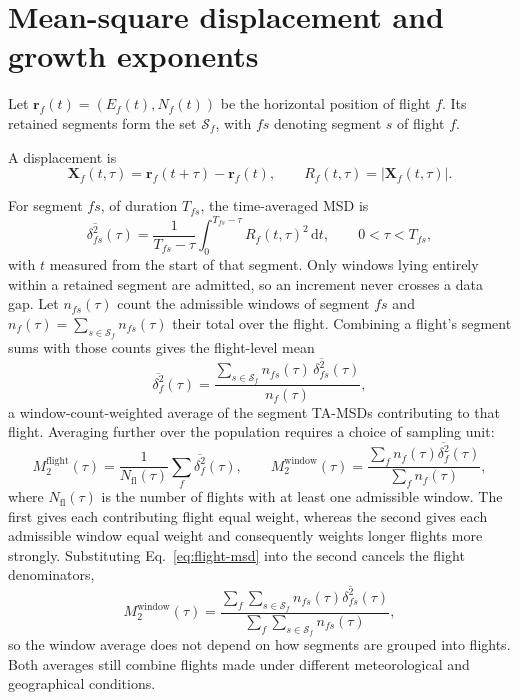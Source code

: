 \FloatBarrier
\section{Mean-square displacement and growth exponents}
\label{sec:estimator}
\label{sec:obs-global}

Let $\mathbf r_f(t)=(E_f(t),N_f(t))$ be the horizontal position of flight $f$.
Its retained segments form the set $\mathcal S_f$, with $fs$ denoting segment $s$
of flight $f$.

A displacement is
\begin{equation}
  \mathbf X_f(t,\tau)=\mathbf r_f(t+\tau)-\mathbf r_f(t),
  \qquad R_f(t,\tau)=|\mathbf X_f(t,\tau)|.
  \label{eq:displacement-global}
\end{equation}

For segment $fs$, of duration $T_{fs}$, the time-averaged MSD is
\begin{equation}
  \overline{\delta_{fs}^2}(\tau)
    =\frac{1}{T_{fs}-\tau}\int_0^{T_{fs}-\tau}R_f(t,\tau)^2\,\mathrm dt,
  \qquad 0<\tau<T_{fs},
  \label{eq:ta-msd}
\end{equation}
with $t$ measured from the start of that segment.
Only windows lying entirely within a retained segment are admitted, so an increment never
crosses a data gap. Let $n_{fs}(\tau)$ count the admissible windows of segment $fs$ and
$n_f(\tau)=\sum_{s\in\mathcal S_f}n_{fs}(\tau)$ their total over the flight. Combining a
flight's segment sums with those counts gives the flight-level mean
\begin{equation}
  \overline{\delta_f^2}(\tau)
   =\frac{\sum_{s\in\mathcal S_f}n_{fs}(\tau)\,\overline{\delta_{fs}^2}(\tau)}{n_f(\tau)},
  \label{eq:flight-msd}
\end{equation}
a window-count-weighted average of the segment TA-MSDs contributing to that flight.
Averaging further over the population requires a choice of sampling unit:
\begin{equation}
  M_2^{\mathrm{flight}}(\tau)
   =\frac{1}{N_{\mathrm{fl}}(\tau)}\sum_f\overline{\delta_f^2}(\tau),
  \qquad
  M_2^{\mathrm{window}}(\tau)
   =\frac{\sum_f n_f(\tau)\overline{\delta_f^2}(\tau)}{\sum_f n_f(\tau)},
  \label{eq:weights-global}
\end{equation}
where $N_{\mathrm{fl}}(\tau)$ is the number of flights with at least one admissible window.
The first gives each contributing flight equal weight, whereas the second gives each
admissible window equal weight and consequently weights longer flights more strongly.
Substituting Eq.~\eqref{eq:flight-msd} into the second cancels the flight denominators,
\begin{equation}
 M_2^{\mathrm{window}}(\tau)
  =\frac{\sum_f\sum_{s\in\mathcal S_f}n_{fs}(\tau)\overline{\delta_{fs}^2}(\tau)}
        {\sum_f\sum_{s\in\mathcal S_f}n_{fs}(\tau)},
 \label{eq:window-segments}
\end{equation}
so the window average does not depend on how segments are grouped into flights.
Both averages still combine flights made under different meteorological and geographical
conditions.

